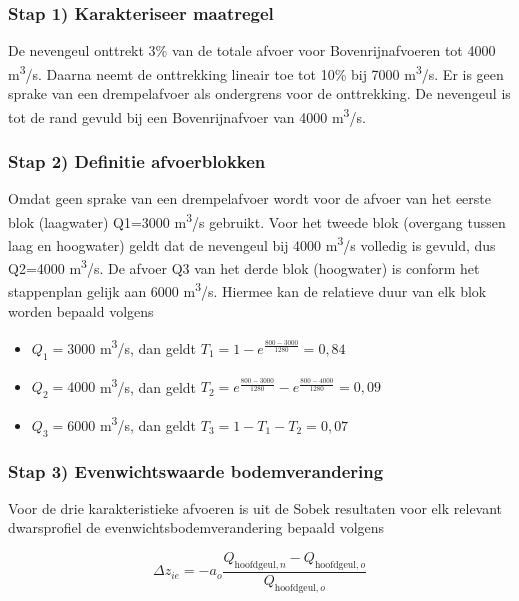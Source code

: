 \subsubsection*{Stap 1) Karakteriseer maatregel}

De nevengeul onttrekt 3\% van de totale afvoer voor Bovenrijnafvoeren tot 4000 m\textsuperscript{3}/s.
Daarna neemt de onttrekking lineair toe tot 10\% bij 7000 m\textsuperscript{3}/s.
Er is geen sprake van een drempelafvoer als ondergrens voor de onttrekking.
De nevengeul is tot de rand gevuld bij een Bovenrijnafvoer van 4000 m\textsuperscript{3}/s.

\subsubsection*{Stap 2) Definitie afvoerblokken}

Omdat geen sprake van een drempelafvoer wordt voor de afvoer van het eerste blok (laagwater) Q1=3000 m\textsuperscript{3}/s gebruikt.
Voor het tweede blok (overgang tussen laag en hoogwater) geldt dat de nevengeul bij 4000 m\textsuperscript{3}/s volledig is gevuld, dus Q2=4000 m\textsuperscript{3}/s.
De afvoer Q3 van het derde blok (hoogwater) is conform het stappenplan gelijk aan 6000 m\textsuperscript{3}/s.
Hiermee kan de relatieve duur van elk blok worden bepaald volgens

\begin{itemize}
\item $Q_1=3000$ m\textsuperscript{3}/s, dan geldt $T_1 = 1-e^{\frac{800-3000}{1280}} = 0,84$
\item $Q_2=4000$ m\textsuperscript{3}/s, dan geldt $T_2 = e^{\frac{800-3000}{1280}} - e^{\frac{800-4000}{1280}} = 0,09$
\item $Q_3=6000$ m\textsuperscript{3}/s, dan geldt $T_3 = 1-T_1-T_2 = 0,07$
\end{itemize}

\subsubsection*{Stap 3) Evenwichtswaarde bodemverandering}

Voor de drie karakteristieke afvoeren is uit de Sobek resultaten voor elk relevant dwarsprofiel de evenwichtsbodemverandering bepaald volgens

\begin{equation}
\Delta z_{ie} = -a_o \frac{Q_{\text{hoofdgeul},n} - Q_{\text{hoofdgeul},o}}{Q_{\text{hoofdgeul},o}}
\end{equation}

